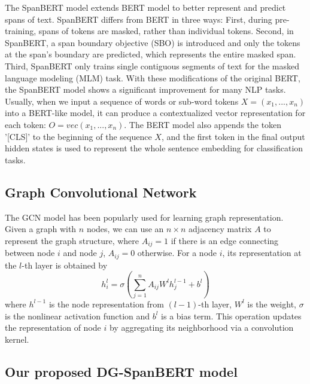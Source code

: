 \documentclass{article}
\begin{document}
The SpanBERT model \cite{joshi2019spanbert} extends BERT model \cite{devlin_bert} to better represent and predict spans of text. SpanBERT differs from BERT in three ways: First, during pre-training, spans of tokens are masked, rather than  individual tokens. Second, in SpanBERT, a span boundary objective (SBO) is introduced and only the tokens at the span's boundary are predicted, which represents the entire masked span. Third, SpanBERT only trains single contiguous segments of text for the masked language modeling (MLM) task. With these modifications of the original BERT, the SpanBERT model shows a significant improvement for many NLP tasks. Usually, when we input a sequence of words or sub-word tokens $X = (x_1,..., x_n)$ into a BERT-like model, it can produce a contextualized vector representation for each token: $O = vec (x_1,...,x_n)$. The BERT model also appends the token '[CLS]' to the beginning of the sequence $X$, and the first token in the final output hidden states is used to represent the whole sentence embedding for classification tasks.

\subsection{Graph Convolutional Network}

The GCN model \cite{kipf2016semi} has been popularly used for learning  graph representation. Given a graph with $n$ nodes, we can use an $n \times n$ adjacency matrix $A$ to represent the graph structure, where $A_{ij} = 1$ if there is an edge connecting between node $i$ and node $j$, $A_{ij} = 0$ otherwise.  For a node $i$, its representation  at the $l$-th layer is obtained by 
\begin{equation} h_i^l = \sigma(\sum_{j=1}^{n} A_{ij} W^{l} h_{j}^{l-1} + b^{l})
\end{equation}
where $h^{l-1}$ is the node representation from $(l-1)$-th layer, $W^{l}$ is the weight, $\sigma$ is the nonlinear activation function and $b^{l}$ is a bias term. This operation updates the representation of node $i$ by aggregating its neighborhood  via a convolution kernel. \subsection{Our proposed  DG-SpanBERT model}
\end{document}
